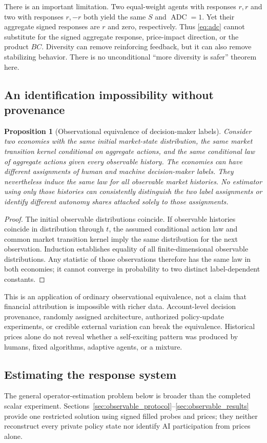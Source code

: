 \documentclass[11pt,a4paper]{article}
\newtheorem{proposition}[theorem]{Proposition}
\theoremstyle{definition}
\theoremstyle{remark}
\newcommand{\ADC}{\operatorname{ADC}}
\begin{document}
There is an important limitation. Two equal-weight agents with responses $r,r$ and two with responses $r,-r$ both yield the same $S$ and $\ADC=1$. Yet their aggregate signed responses are $r$ and zero, respectively. Thus \cref{eq:adc} cannot substitute for the signed aggregate response, price-impact direction, or the product $BC$. Diversity can remove reinforcing feedback, but it can also remove stabilizing behavior. There is no unconditional ``more diversity is safer'' theorem here.

\subsection{An identification impossibility without provenance}
\begin{proposition}[Observational equivalence of decision-maker labels]
\label{prop:identification}
Consider two economies with the same initial market-state distribution, the same market transition kernel conditional on aggregate actions, and the same conditional law of aggregate actions given every observable history. The economies can have different assignments of human and machine decision-maker labels. They nevertheless induce the same law for all observable market histories. No estimator using only those histories can consistently distinguish the two label assignments or identify different autonomy shares attached solely to those assignments.
\end{proposition}
\begin{proof}
The initial observable distributions coincide. If observable histories coincide in distribution through $t$, the assumed conditional action law and common market transition kernel imply the same distribution for the next observation. Induction establishes equality of all finite-dimensional observable distributions. Any statistic of those observations therefore has the same law in both economies; it cannot converge in probability to two distinct label-dependent constants.
\end{proof}
This is an application of ordinary observational equivalence, not a claim that financial attribution is impossible with richer data. Account-level decision provenance, randomly assigned architecture, authorized policy-update experiments, or credible external variation can break the equivalence. Historical prices alone do not reveal whether a self-exciting pattern was produced by humans, fixed algorithms, adaptive agents, or a mixture.

\subsection{Estimating the response system}
The general operator-estimation problem below is broader than the completed scalar experiment. Sections~\ref{sec:observable_protocol}--\ref{sec:observable_results} provide one restricted solution using signed filled probes and prices; they neither reconstruct every private policy state nor identify AI participation from prices alone.
\end{document}
